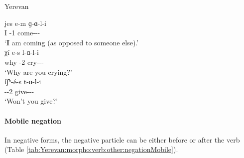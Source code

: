 \begin{exe}
	\ex Yerevan \label{sent:Yerevan:morpho:verb:other:irregImpfIs} \begin{xlist}
		\ex \gll jes e-m ɡ-ɑ-l-i \\
		I {\aux}-1{\sg} come-{\thgloss}-{\infgloss}-{\impfcvb} \\
		\trans `\textbf{I} am coming (as opposed to someone else).' \\
		\ex \gll χ\'i e-s l-ɑ-l-i \\
		why {\aux}-2{\sg} cry-{\thgloss}-{\infgloss}-{\impfcvb} \\
		\trans `Why are you crying?' \\
		\ex \gll t͡ʃʰ-\'e-s t-ɑ-l-i \\
		{\neggloss}-{\aux}-2{\sg} give-{\thgloss}-{\infgloss}-{\impfcvb} \\
		\trans `Won't you give?' \\
	\end{xlist} 
\end{exe}

\paragraph{Mobile negation }


In negative forms, the negative particle can be either before or after the verb (Table \ref{tab:Yerevan:morpho:verb:other:negationMobile}). 


